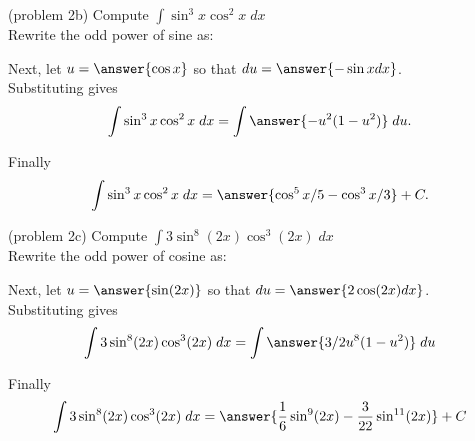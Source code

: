 \documentclass[handout]{ximera}
\begin{document}
\begin{problem}{\color{gray}(problem 2b)} 
Compute $\displaystyle{\int \sin^3 x\cos^2 x \; dx}$\\

Rewrite the odd power of sine as:

\begin{multipleChoice}
\end{multipleChoice}

Next, let $u = \answer{\cos x}$ so that $du = \answer{-\sin x dx}$.\\

Substituting gives
\[
\int \sin^3 x\cos^2 x \; dx= \int \answer{-u^2(1-u^2)} \; du.
\]

Finally
\[
\int \sin^3 x\cos^2 x \; dx= \answer{\cos^5 x/5 - \cos^3 x/3} + C.
\]

\end{problem}



\begin{problem}{\color{gray}(problem 2c)}
Compute $\displaystyle{\int 3\sin^8(2x)\cos^3(2x) \; dx}$\\

Rewrite the odd power of cosine as:

\begin{multipleChoice}
\end{multipleChoice}

Next, let $u = \answer{\sin(2x)}$ so that $du = \answer{2\cos(2x) dx}$.\\

Substituting gives
\[
\int 3\sin^8(2x)\cos^3(2x) \; dx= \int \answer{3/2 u^8(1-u^2)} \; du
\]

Finally
\[
\int 3\sin^8(2x)\cos^3(2x) \; dx= \answer{\frac16 \sin^9(2x)- \frac{3}{22} \sin^{11}(2x)} + C
\]
\end{problem}
\end{document}
